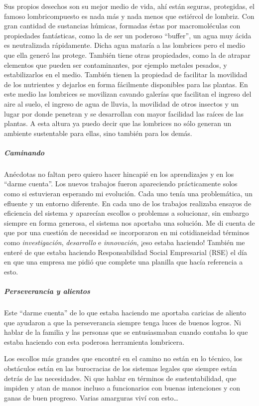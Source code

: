 \documentclass[
]{article}
\begin{document}
Sus propios desechos son su mejor medio de vida, ahí están seguras,
protegidas, el famoso lombricompuesto es nada más y nada menos que
estiércol de lombriz. Con gran cantidad de sustancias húmicas, formadas
éstas por macromoléculas con propiedades fantásticas, como la de ser un
poderoso ``buffer'', un agua muy ácida es neutralizada rápidamente.
Dicha agua mataría a las lombrices pero el medio que ella generó las
protege. También tiene otras propiedades, como la de atrapar elementos
que pueden ser contaminantes, por ejemplo metales pesados, y
estabilizarlos en el medio. También tienen la propiedad de facilitar la
movilidad de los nutrientes y dejarlos en forma fácilmente disponibles
para las plantas. En este medio las lombrices se movilizan cavando
galerías que facilitan el ingreso del aire al suelo, el ingreso de agua
de lluvia, la movilidad de otros insectos y un lugar por donde penetran
y se desarrollan con mayor facilidad las raíces de las plantas. A esta
altura ya puedo decir que las lombrices no sólo generan un ambiente
sustentable para ellas, sino también para los demás.

\hypertarget{caminando}{%
\subparagraph{Caminando}\label{caminando}}

Anécdotas no faltan pero quiero hacer hincapié en los aprendizajes y en
los ``darme cuenta''. Los nuevos trabajos fueron apareciendo
prácticamente solos como si estuvieran esperando mi evolución. Cada uno
tenía una problemática, un efluente y un entorno diferente. En cada uno
de los trabajos realizaba ensayos de eficiencia del sistema y aparecían
escollos o problemas a solucionar, sin embargo siempre en forma
generosa, el sistema nos aportaba una solución. Me di cuenta de que por
una cuestión de necesidad se incorporaron en mi cotidianeidad términos
como \emph{investigación}, \emph{desarrollo} e \emph{innovación}, ¡eso
estaba haciendo! También me enteré de que estaba haciendo
Responsabilidad Social Empresarial (RSE) el día en que una empresa me
pidió que complete una planilla que hacía referencia a esto.

\hypertarget{perseverancia-y-alientos}{%
\subparagraph{Perseverancia y alientos}\label{perseverancia-y-alientos}}

Este ``darme cuenta'' de lo que estaba haciendo me aportaba caricias de
aliento que ayudaron a que la perseverancia siempre tenga luces de
buenos logros. Ni hablar de la familia y las personas que se
entusiasmaban cuando contaba lo que estaba haciendo con esta poderosa
herramienta lombricera.

Los escollos más grandes que encontré en el camino no están en lo
técnico, los obstáculos están en las burocracias de los sistemas legales
que siempre están detrás de las necesidades. Ni que hablar en términos
de sustentabilidad, que impiden y atan de manos incluso a funcionarios
con buenas intenciones y con ganas de buen progreso. Varias amarguras
viví con esto\ldots{}
\end{document}
